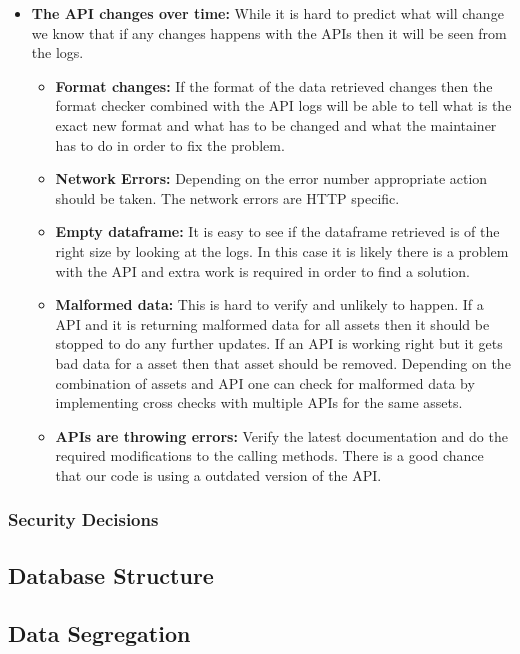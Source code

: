 \documentclass[main.tex]{subfiles}
\begin{document}
\begin{itemize}
    \item \textbf{The API changes over time: }
    While it is hard to predict what will change we know that if any changes happens with the APIs then it will be seen from the logs. 
    \begin{itemize}
        \item \textbf{Format changes:} If the format of the data retrieved changes then the format checker combined with the API logs will be able to tell what is the exact new format and what has to be changed and what the maintainer has to do in order to fix the problem.
        \item \textbf{Network Errors:}  Depending on the error number appropriate action should be taken. The network errors are HTTP specific. 
        \item \textbf{Empty dataframe:} It is easy to see if the dataframe retrieved is of the right size by looking at the logs. In this case it is likely there is a problem with the API and extra work is required in order to find a solution.
        \item \textbf{Malformed data:} This is  hard to verify and unlikely to happen.  If a API and it is returning malformed data for all assets then it should be stopped to do any further updates. If an API is working right but it gets bad data for a asset then that asset should be removed. Depending on the combination of assets and API one can check for malformed data  by implementing cross checks with multiple APIs for the same assets.
        \item \textbf{APIs are throwing errors:} Verify the latest documentation and do the required modifications to the calling methods. There is a good chance that our code is using a outdated version of the API.
    \end{itemize}
\end{itemize}

\subsubsection{Security Decisions}


\subsection{Database Structure}
\label{DB Structure}

\subsection{Data Segregation}
\end{document}
